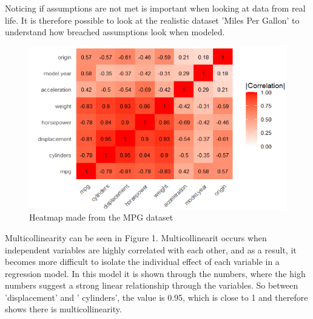 Noticing if assumptions are not met is important when looking at data from real life.
It is therefore possible to look at the realistic dataset 'Miles Per Gallon' to understand how breached assumptions look when modeled. \newline

\begin{figure}
	\centering
		\centering
		\includegraphics{billder/1.png}
		\caption{Heatmap made from the MPG dataset}
		\label{fig:1}
 \end{figure}

Multicollinearity can be seen in Figure 1. Multicollinearit occurs when independent variables are highly correlated with each other, and as a result, it becomes more difficult to isolate the individual effect of each variable in a regression model.
In this model it is shown through the numbers, where the high numbers suggest a strong linear relationship through the variables. So between 'displacement' and ' cylinders', the value is 0.95, which is close to 1 and therefore shows there is multicollinearity. \newline

